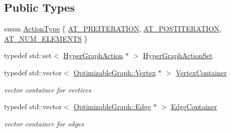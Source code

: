 \subsection*{Public Types}
\begin{DoxyCompactItemize}
\item 
enum \hyperlink{structg2o_1_1OptimizableGraph_a16d90305c171fe0582c6a8aef40ba89d}{Action\+Type} \{ \hyperlink{structg2o_1_1OptimizableGraph_a16d90305c171fe0582c6a8aef40ba89dad79dc2fea3676bc2e26a83b7aca0cff6}{A\+T\+\_\+\+P\+R\+E\+I\+T\+E\+R\+A\+T\+I\+ON}, 
\hyperlink{structg2o_1_1OptimizableGraph_a16d90305c171fe0582c6a8aef40ba89da6022cb4383dca15d503e600c463c5e5a}{A\+T\+\_\+\+P\+O\+S\+T\+I\+T\+E\+R\+A\+T\+I\+ON}, 
\hyperlink{structg2o_1_1OptimizableGraph_a16d90305c171fe0582c6a8aef40ba89da33b97f5bc80d2e6227c95364573d3651}{A\+T\+\_\+\+N\+U\+M\+\_\+\+E\+L\+E\+M\+E\+N\+TS}
 \}
\item 
typedef std\+::set$<$ \hyperlink{classg2o_1_1HyperGraphAction}{Hyper\+Graph\+Action} $\ast$ $>$ \hyperlink{structg2o_1_1OptimizableGraph_aa3562ad6794c36ea832095131cfffaac}{Hyper\+Graph\+Action\+Set}
\item 
typedef std\+::vector$<$ \hyperlink{classg2o_1_1OptimizableGraph_1_1Vertex}{Optimizable\+Graph\+::\+Vertex} $\ast$ $>$ \hyperlink{structg2o_1_1OptimizableGraph_a54f01b9b6071e65e6abeebe4afb29dec}{Vertex\+Container}
\begin{DoxyCompactList}\small\item\em vector container for vertices \end{DoxyCompactList}\item 
typedef std\+::vector$<$ \hyperlink{classg2o_1_1OptimizableGraph_1_1Edge}{Optimizable\+Graph\+::\+Edge} $\ast$ $>$ \hyperlink{structg2o_1_1OptimizableGraph_a2b43e807ae6d61ef8749ca1ef7c25f62}{Edge\+Container}
\begin{DoxyCompactList}\small\item\em vector container for edges \end{DoxyCompactList}\end{DoxyCompactItemize}
